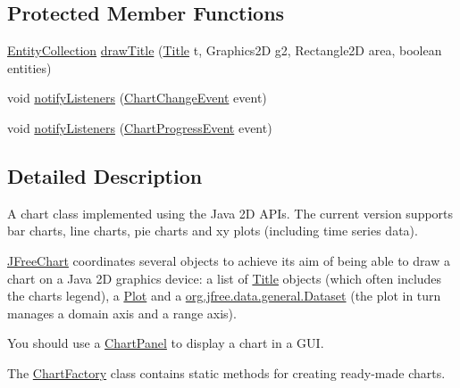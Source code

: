 \subsection*{Protected Member Functions}
\begin{DoxyCompactItemize}
\item 
\mbox{\hyperlink{interfaceorg_1_1jfree_1_1chart_1_1entity_1_1_entity_collection}{Entity\+Collection}} \mbox{\hyperlink{classorg_1_1jfree_1_1chart_1_1_j_free_chart_a9d6071339cc99db3dc5c2f7057a7231f}{draw\+Title}} (\mbox{\hyperlink{classorg_1_1jfree_1_1chart_1_1title_1_1_title}{Title}} t, Graphics2D g2, Rectangle2D area, boolean entities)
\item 
void \mbox{\hyperlink{classorg_1_1jfree_1_1chart_1_1_j_free_chart_a4b3fe101e26f688aff9b1ba6ed5bdd29}{notify\+Listeners}} (\mbox{\hyperlink{classorg_1_1jfree_1_1chart_1_1event_1_1_chart_change_event}{Chart\+Change\+Event}} event)
\item 
void \mbox{\hyperlink{classorg_1_1jfree_1_1chart_1_1_j_free_chart_a7b4f6e4021f4a1b08ece599d26b83175}{notify\+Listeners}} (\mbox{\hyperlink{classorg_1_1jfree_1_1chart_1_1event_1_1_chart_progress_event}{Chart\+Progress\+Event}} event)
\end{DoxyCompactItemize}


\subsection{Detailed Description}
A chart class implemented using the Java 2D A\+P\+Is. The current version supports bar charts, line charts, pie charts and xy plots (including time series data). 

\mbox{\hyperlink{classorg_1_1jfree_1_1chart_1_1_j_free_chart}{J\+Free\+Chart}} coordinates several objects to achieve its aim of being able to draw a chart on a Java 2D graphics device\+: a list of \mbox{\hyperlink{}{Title}} objects (which often includes the chart\textquotesingle{}s legend), a \mbox{\hyperlink{}{Plot}} and a \mbox{\hyperlink{interfaceorg_1_1jfree_1_1data_1_1general_1_1_dataset}{org.\+jfree.\+data.\+general.\+Dataset}} (the plot in turn manages a domain axis and a range axis). 

You should use a \mbox{\hyperlink{classorg_1_1jfree_1_1chart_1_1_chart_panel}{Chart\+Panel}} to display a chart in a G\+UI. 

The \mbox{\hyperlink{classorg_1_1jfree_1_1chart_1_1_chart_factory}{Chart\+Factory}} class contains static methods for creating \textquotesingle{}ready-\/made\textquotesingle{} charts.

